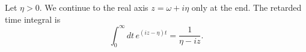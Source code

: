\documentclass{article}
\begin{document}
Let $\eta>0$. We continue to the real axis $z = \omega + i\eta$ only at the end. The retarded time integral is
\begin{equation}
\int_0^{\infty} dt\, e^{(iz-\eta)t}=\frac{1}{\eta-iz} .
\label{eq:ret}
\end{equation}
\end{document}

